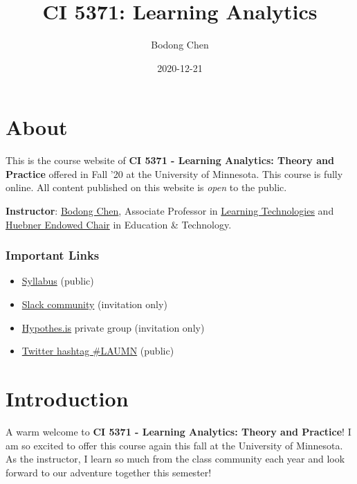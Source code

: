 \documentclass[
]{book}
\title{CI 5371: Learning Analytics}
\author{Bodong Chen}
\date{2020-12-21}
\providecommand{\tightlist}{%
  \setlength{\itemsep}{0pt}\setlength{\parskip}{0pt}}
\begin{document}
\maketitle

{
\setcounter{tocdepth}{1}
\tableofcontents
}
\hypertarget{about}{%
\chapter*{About}\label{about}}

This is the course website of \textbf{CI 5371 - Learning Analytics: Theory and Practice} offered in Fall '20 at the University of Minnesota. This course is fully online. All content published on this website is \emph{open} to the public.

\textbf{Instructor}: \href{https://bodong.me/}{Bodong Chen}, Associate Professor in \href{http://www.cehd.umn.edu/ci/academics/LearningTechnologies/}{Learning Technologies} and \href{https://www.cehd.umn.edu/giving/gifts/}{Huebner Endowed Chair} in Education \& Technology.

\hypertarget{important-links}{%
\subsection*{Important Links}\label{important-links}}

\begin{itemize}
\tightlist
\item
  \href{https://docs.google.com/document/d/1Y8kx_7IgM4sL9zvuG729uG6oo9p_BOxtUiNyGcDL-f8/edit?usp=sharing}{Syllabus} (public)
\item
  \href{https://la-mn.slack.com/}{Slack community} (invitation only)
\item
  \href{https://hypothes.is/}{Hypothes.is} private group (invitation only)
\item
  \href{https://twitter.com/search?q=\%23LAUMN\&src=typd}{Twitter hashtag \#LAUMN} (public)
\end{itemize}

\hypertarget{intro}{%
\chapter{Introduction}\label{intro}}

A warm welcome to \textbf{CI 5371 - Learning Analytics: Theory and Practice}! I am so excited to offer this course again this fall at the University of Minnesota. As the instructor, I learn so much from the class community each year and look forward to our adventure together this semester!
\end{document}
